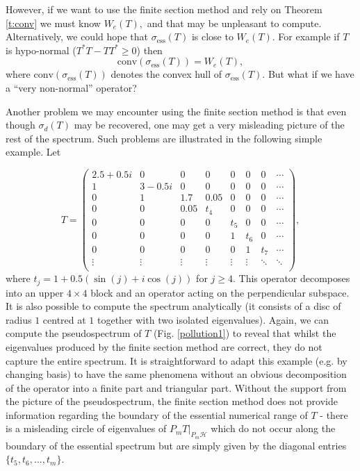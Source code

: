 \documentclass[a4paper,10pt]{article}
\begin{document}
However, if we want to use the finite section method and rely on Theorem
\ref{t:conv} we must know $W_e(T),$ and that may be unpleasant to
compute. Alternatively, we could hope that $\sigma_{\mathrm{ess}}(T)$ is close to $W_e(T)$. For example if $T$ is hypo-normal
($T^*T - TT^* \geq 0$) then
$$
\mathrm{conv}(\sigma_{\mathrm{ess}}(T)) = W_e(T),
$$
where $\mathrm{conv}(\sigma_{\mathrm{ess}}(T))$ denotes the convex hull of
$\sigma_{\mathrm{ess}}(T).$ But what if we have a ``very non-normal'' operator? 

Another problem we may encounter using the finite section method is that even
though $\sigma_d(T)$ may be recovered, one may get a very misleading
picture of the rest of the spectrum. Such problems are illustrated in
the following simple example. Let



\begin{equation}\label{eq:the_T}
T = \left(
\begin{array}{cccc|cccc}
 2.5 +0.5i  & 0        & 0      & 0     &  0     & 0      &0        &\cdots\\
 1          & 3 -0.5i  & 0      & 0     &  0     & 0      &0        &\cdots\\
 0          & 1        & 1.7    & 0.05  &  0     & 0      &0        &\cdots\\
 0          & 0        & 0.05   & t_4     &  0     & 0      &0        &\cdots\\
\hline
 0          & 0        & 0      & 0     &  t_5     & 0      &0        &\cdots\\
 0          & 0        & 0      & 0     &  1     & t_6      &0        &\cdots\\
 0          & 0        & 0      & 0     &  0     & 1      &t_7        &\cdots\\
                                                                
\vdots      & \vdots   & \vdots & \vdots& \vdots & \vdots &\ddots   &\ddots\\
\end{array}
\right),
\end{equation}
where $t_j=1+0.5(\sin(j)+i\cos(j))$ for $j \geq 4.$ This operator decomposes into an upper $4\times 4$ block and an operator acting on the perpendicular subspace. It is also possible to compute the spectrum analytically (it consists of a disc of radius $1$ centred at $1$ together with two isolated eigenvalues). Again, we can compute the pseudospectrum of $T$ (Fig. \ref{pollution1}) to reveal that whilst the eigenvalues produced by the finite section method are correct, they do not capture the entire spectrum. It is straightforward to adapt this example (e.g. by changing basis) to have the same phenomena without an obvious decomposition of the operator into a finite part and triangular part. Without the support from the picture of the pseudospectrum, the finite section method does not provide information regarding the boundary of the essential numerical range of $T$ - there is a misleading circle of eigenvalues of $P_mT|_{P_m\mathcal{H}}$ which do not occur along the boundary of the essential spectrum but are simply given by the diagonal entries $\{t_5,t_6,...,t_m\}$.
\end{document}
